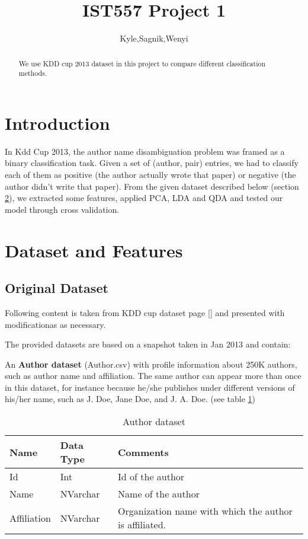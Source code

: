 \documentclass[a4paper]{article}
\title{IST557 Project 1}
\author{Kyle,Sagnik,Wenyi}
\begin{document}
\maketitle

\begin{abstract}
We use KDD cup 2013 dataset in this project to compare different classification methods. 
\end{abstract}

\section{Introduction}

In Kdd Cup 2013, the author name disambiguation problem was framed as a binary classification task. Given a set of (author, pair) entries, we had to classify each of them as positive (the author actually wrote that paper) or negative (the author didn't write that paper). From the given dataset described below (section \ref{sec:examples}), we extracted some features, applied PCA, LDA and QDA and tested our model through cross validation.  

\section{Dataset and Features}
\label{sec:examples}

\subsection{Original Dataset}
Following content is taken from KDD cup dataset page [] and presented with modificationas as necessary. 


The provided datasets are based on a snapshot taken in Jan 2013 and contain:

An \textbf{Author dataset} (Author.csv) with profile information about 250K authors, such as author name and affiliation. The same author can appear more than once in this dataset, for instance because he/she publishes under different versions of his/her name, such as J. Doe, Jane Doe, and J. A. Doe. (see table \ref{table:author})

\begin{table}
  \caption{Author dataset}
\begin{tabular}{ |l |l |l |}
  \hline
  \textbf{Name} & \textbf{Data Type} & \textbf{Comments} \\ \hline
  Id & Int & Id of the author\\ \hline
  Name & NVarchar &  Name of the author\\ \hline
  Affiliation & NVarchar & Organization name with which the author is affiliated.  \\ \hline
\end{tabular}
\label{table:author}
\end{table}
\end{document}
